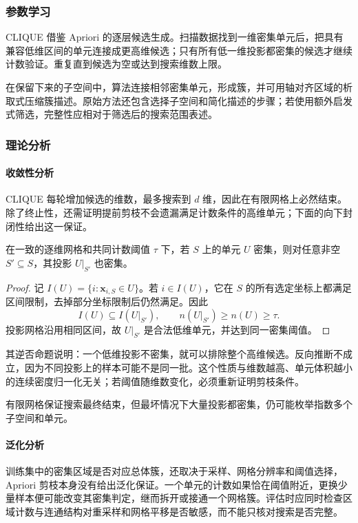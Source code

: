 \subsubsection{参数学习}

CLIQUE 借鉴 Apriori 的逐层候选生成。扫描数据找到一维密集单元后，把具有兼容低维区间的单元连接成更高维候选；只有所有低一维投影都密集的候选才继续计数验证。重复直到候选为空或达到搜索维数上限。

在保留下来的子空间中，算法连接相邻密集单元，形成簇，并可用轴对齐区域的析取式压缩簇描述。原始方法还包含选择子空间和简化描述的步骤；若使用额外启发式筛选，完整性应相对于筛选后的搜索范围表述。

\subsubsection{理论分析}

\paragraph{收敛性分析}
CLIQUE 每轮增加候选的维数，最多搜索到 $d$ 维，因此在有限网格上必然结束。除了终止性，还需证明提前剪枝不会遗漏满足计数条件的高维单元；下面的向下封闭性给出这一保证。

\begin{theorem}[子空间密集性的向下封闭性]
 \label{thm:clustering-clique}
 在一致的逐维网格和共同计数阈值 $\tau$ 下，若 $S$ 上的单元 $U$ 密集，则对任意非空 $S'\subseteq S$，其投影 $U|_{S'}$ 也密集。
\end{theorem}
\begin{proof}
记 $I(U)=\{i:\bm{x}_{i,S}\in U\}$。若 $i\in I(U)$，它在 $S$ 的所有选定坐标上都满足区间限制，去掉部分坐标限制后仍然满足。因此
\[
 I(U)\subseteq I(U|_{S'}),\qquad
 n(U|_{S'})\geq n(U)\geq\tau.
\]
投影网格沿用相同区间，故 $U|_{S'}$ 是合法低维单元，并达到同一密集阈值。
\end{proof}

其逆否命题说明：一个低维投影不密集，就可以排除整个高维候选。反向推断不成立，因为不同投影上的样本可能不是同一批。这个性质与维数越高、单元体积越小的连续密度归一化无关；若阈值随维数变化，必须重新证明剪枝条件。

有限网格保证搜索最终结束，但最坏情况下大量投影都密集，仍可能枚举指数多个子空间和单元。

\paragraph{泛化分析}
训练集中的密集区域是否对应总体簇，还取决于采样、网格分辨率和阈值选择，Apriori 剪枝本身没有给出泛化保证。一个单元的计数如果恰在阈值附近，更换少量样本便可能改变其密集判定，继而拆开或接通一个网格簇。评估时应同时检查区域计数与连通结构对重采样和网格平移是否敏感，而不能只核对搜索是否完整。

